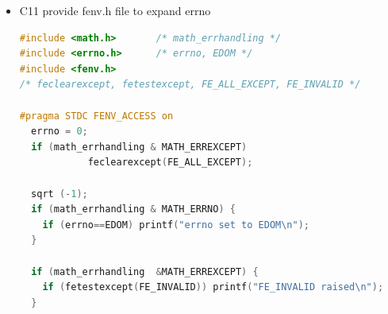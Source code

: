\documentclass[a4paper,12pt,twoside]{book}
\begin{document}
\begin{itemize}
\item C11 provide fenv.h file to expand errno
\begin{lstlisting}[frame=single, language=c++]
#include <math.h>       /* math_errhandling */
#include <errno.h>      /* errno, EDOM */
#include <fenv.h>
/* feclearexcept, fetestexcept, FE_ALL_EXCEPT, FE_INVALID */

#pragma STDC FENV_ACCESS on
  errno = 0;
  if (math_errhandling & MATH_ERREXCEPT)
            feclearexcept(FE_ALL_EXCEPT);

  sqrt (-1);
  if (math_errhandling & MATH_ERRNO) {
    if (errno==EDOM) printf("errno set to EDOM\n");
  }

  if (math_errhandling  &MATH_ERREXCEPT) {
    if (fetestexcept(FE_INVALID)) printf("FE_INVALID raised\n");
  }
\end{lstlisting}

\end{itemize}
\end{document}

